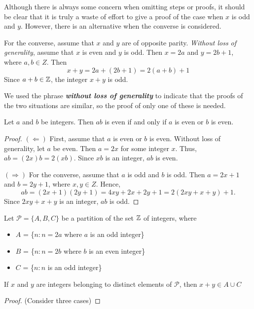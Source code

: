 \begin{remark}
    Although there is always some concern when omitting steps or proofs, it
    should be clear that it is truly a waste of effort to give a proof of the
    case when $x$ is odd and $y$. However,  there is an alternative when the
    converse is considered.

    For the converse, assume that $x$ and $y$ are of opposite parity.\emph{
    Without loss of generality}, assume that $x$ is even and $y$ is odd. Then $x
    = 2a$ and $y = 2b + 1$, where $a, b \in Z$. Then
    \begin{equation*}
        x + y = 2a + (2b + 1) = 2(a + b) + 1
    \end{equation*}
    Since $a + b \in \mathbb{Z}$, the integer $x + y$ is odd.

    We used the phrase \textbf{\emph{without loss of generality}} to indicate
    that the proofs of the two situations are similar, so the proof of only one
    of these is needed.
\end{remark}
\begin{thm}
    Let $a$ and $b$ be integers. Then $ab$ is even if and only if $a$ is even or
    $b$ is even.
    \begin{proof}
        $(\Leftarrow)$ First, assume that $a$ is even or $b$ is even. Without loss of
        generality, let $a$ be even. Then $a = 2x$ for some integer $x$. Thus,
        $ab = (2x)b = 2(xb)$. Since $xb$ is an integer, $ab$ is even.

        $(\Rightarrow)$ For the converse, assume that $a$ is odd and $b$ is odd. Then $a = 2x +
        1$ and $b = 2y + 1$, where $x, y \in Z$. Hence,
        \begin{equation*}
            ab = (2x + 1)(2y + 1) = 4xy + 2x + 2y + 1 = 2(2xy + x + y) + 1.
        \end{equation*}
        Since $2xy + x + y$ is an integer, $ab$ is odd.
    \end{proof}
\end{thm}
\begin{result}
    Let $\mathcal{P} = \{A, B,C\}$ be a partition of the set $\mathbb{Z}$ of integers,
    where
    \begin{itemize}
         \item[] $A$ = \{$n : n = 2a$ where $a$ is an odd integer\}
         \item[] $B$ = \{$n:n=2b$ where $b$ is an even integer\} 
         \item[] $C$ = \{$n : n$ is an odd integer\}
    \end{itemize}
    If $x$ and $y$ are integers belonging to distinct elements of $\mathcal{P}$,
    then $x + y \in A \cup C$
    \begin{proof}
        (Consider three cases)
    \end{proof}
\end{result}

